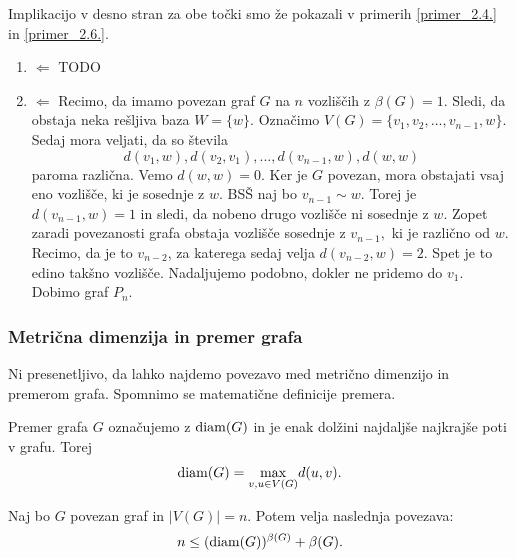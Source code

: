 \documentclass[mat1, tisk]{fmfdelo}
\begin{document}
\begin{dokaz}
    Implikacijo v desno stran za obe točki smo že pokazali v primerih \ref{primer_2.4.} in 
    \ref{primer_2.6.}.
    \begin{enumerate}
        \item $\Leftarrow$  TODO
        \item $\Leftarrow$
        Recimo, da imamo povezan graf $G$ na $n$ vozliščih z $\beta(G) = 1.$ Sledi, da obstaja neka 
        rešljiva baza $W = \{ w \}.$ Označimo $V(G) = \{ v_1, v_2, ... , v_{n-1}, w\}.$ Sedaj mora 
        veljati, da so števila 
        $$ d(v_1, w),  d(v_2, v_1), ..., d(v_{n-1}, w), d(w, w) $$
        paroma različna. Vemo $d(w, w) = 0$. Ker je $G$ povezan, mora obstajati vsaj eno vozlišče, 
        ki je sosednje z $w$. BSŠ naj bo $v_{n-1} \sim w$. Torej je $d(v_{n-1}, w) = 1$ in sledi, 
        da nobeno drugo vozlišče ni sosednje z $w$. Zopet zaradi povezanosti grafa obstaja vozlišče 
        sosednje z $v_{n-1},$ ki je različno od $w$. Recimo, da je to $v_{n-2}$, za katerega sedaj 
        velja $d(v_{n-2}, w) = 2.$ Spet je to edino takšno vozlišče. Nadaljujemo podobno, 
        dokler ne pridemo do $v_1.$ Dobimo graf $P_n.$
    \end{enumerate}
\end{dokaz}





\subsubsection{Metrična dimenzija in premer grafa}

Ni presenetljivo, da lahko najdemo povezavo med metrično dimenzijo in premerom grafa.
Spomnimo se matematične definicije premera.

\begin{definicija}
    Premer grafa $G$ označujemo z ${\rm diam}(G)$ in je enak dolžini najdaljše najkrajše 
    poti v grafu. Torej $${\rm diam}(G) = \underset{v, u \in V(G)}{\max} d(u, v).$$
\end{definicija}

\begin{trditev}
    Naj bo $G$ povezan graf in $|V(G)| = n$. Potem velja naslednja povezava:
    $$n \leq ({\rm diam}(G))^{\beta (G)} + \beta (G). $$
\end{trditev}
\end{document}

